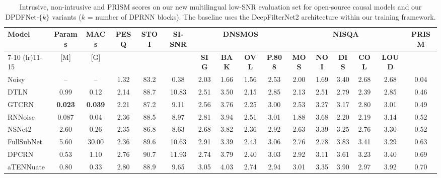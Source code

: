 \documentclass[final,5p,times,authoryear]{elsarticle}
\begin{document}
\begin{table}
    \centering
    \caption{Intrusive, non-intrusive and PRISM scores on our new multilingual low-SNR evaluation set for open-source causal models and our DPDFNet-$\{k\}$ variants ($k$ = number of DPRNN blocks). The baseline uses the DeepFilterNet2 architecture within our training framework.}
    \small
    \setlength{\tabcolsep}{4pt}
    \renewcommand{\arraystretch}{1.15}
    
    \begin{tabular}{lccccccccccccccc}
    \toprule
    \multirow{2}{*}{\textbf{Model}} & 
    \multirow{2}{*}{\textbf{Params}} & 
    \multirow{2}{*}{\textbf{MACs}} & 
    \multirow{2}{*}{\textbf{PESQ}} & 
    \multirow{2}{*}{\textbf{STOI}} & 
    \multirow{2}{*}{\textbf{SI-SNR}} & 
    \multicolumn{4}{c}{\textbf{DNSMOS}} & 
    \multicolumn{5}{c}{\textbf{NISQA}} &
    \multirow{2}{*}{\textbf{PRISM}} \\
    \cmidrule(lr){7-10} \cmidrule(lr){11-15}
     & [M]  & [G]  &  &  &  & \textbf{SIG} & \textbf{BAK} & \textbf{OVL} & \textbf{P.808} & 
     \textbf{MOS} & \textbf{NOI} & \textbf{DIS} & \textbf{COL} & \textbf{LOUD} &  \\
    \midrule
    Noisy & -- & -- & 1.32 & 83.2 & 0.38 & 2.03 & 1.66 & 1.56 & 2.53 & 2.00 & 1.69 & 3.40 & 2.68 & 2.68 & \cellcolor{prismblue}0.04 \\
    \midrule
    DTLN & 0.99 & 0.12 & 2.14 & 88.7 & 10.83 & 2.51 & 3.50 & 2.15 & 2.85 & 2.13 & 2.51 & 2.79 & 2.39 & 2.85 & \cellcolor{prismblue}0.46 \\
    GTCRN & \textbf{0.023} & \textbf{0.039} & 2.21 & 87.2 & 9.11 & 2.56 & 3.76 & 2.25 & 3.00 & 2.53 & 3.27 & 3.17 & 2.80 & 3.01 & \cellcolor{prismblue}0.49 \\
    RNNoise & 0.087 & 0.04 & 2.36 & 88.5 & 8.97 & 2.81 & 3.94 & 2.51 & 3.01 & 1.88 & 3.68 & 2.20 & 2.19 & 3.14 & \cellcolor{prismblue}0.52 \\
    NSNet2 & 2.60 & 0.26 & 2.35 & 86.8 & 8.63 & 2.68 & 3.82 & 2.36 & 2.92 & 2.63 & 3.39 & 3.25 & 2.76 & 3.30 & \cellcolor{prismblue}0.52 \\
    FullSubNet & 5.60 & 30.00 & 2.36 & 89.6 & 10.63 & 2.91 & 3.39 & 2.43 & 3.06 & 2.76 & 2.78 & 3.83 & 3.41 & 3.29 & \cellcolor{prismblue}0.63 \\
    DPCRN & 0.53 & 1.10 & 2.76 & 90.7 & 11.93 & 2.74 & 3.79 & 2.40 & 3.03 & 2.92 & 3.11 & 3.61 & 3.23 & 3.40 & \cellcolor{prismblue}0.69 \\
    aTENNuate & 0.80 & 0.33 & 2.80 & 88.9 & 9.65 & 3.05 & 4.03 & 2.74 & 2.94 & 3.01 & 3.35 & 3.90 & 2.97 & 3.92 & \cellcolor{prismblue}0.70 \\

\end{tabular}
\end{table}
\end{document}
